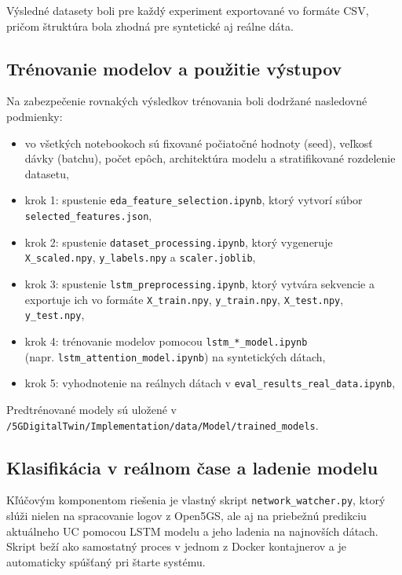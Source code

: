 Výsledné datasety boli pre každý experiment exportované vo formáte CSV, pričom štruktúra bola zhodná pre syntetické aj reálne dáta.

\subsection*{Trénovanie modelov a použitie výstupov}

Na zabezpečenie rovnakých výsledkov trénovania boli dodržané nasledovné podmienky:

\begin{itemize}
  \item vo všetkých notebookoch sú fixované počiatočné hodnoty (seed), veľkosť dávky (batchu), počet epôch, architektúra modelu a stratifikované rozdelenie datasetu,
  \item krok 1: spustenie \texttt{eda\_feature\_selection.ipynb}, ktorý vytvorí súbor \\ \texttt{selected\_features.json},
  \item krok 2: spustenie \texttt{dataset\_processing.ipynb}, ktorý vygeneruje \texttt{X\_scaled.npy}, \texttt{y\_labels.npy} a \texttt{scaler.joblib},
  \item krok 3: spustenie \texttt{lstm\_preprocessing.ipynb}, ktorý vytvára sekvencie a exportuje ich vo formáte \texttt{X\_train.npy}, \texttt{y\_train.npy}, \texttt{X\_test.npy}, \texttt{y\_test.npy},
  \item krok 4: trénovanie modelov pomocou \texttt{lstm\_*\_model.ipynb} \\ (napr. \texttt{lstm\_attention\_model.ipynb}) na syntetických dátach,
  \item krok 5: vyhodnotenie na reálnych dátach v \texttt{eval\_results\_real\_data.ipynb},
\end{itemize}

Predtrénované modely sú uložené v \\ \texttt{/5GDigitalTwin/Implementation/data/Model/trained\_models}.

\subsection*{Klasifikácia v reálnom čase a ladenie modelu}

Kľúčovým komponentom riešenia je vlastný skript \texttt{network\_watcher.py}, ktorý slúži nielen na spracovanie logov z Open5GS, ale aj na priebežnú predikciu aktuálneho UC pomocou LSTM modelu a jeho ladenia na najnovších dátach. Skript beží ako samostatný proces v jednom z Docker kontajnerov a je automaticky spúšťaný pri štarte systému.

